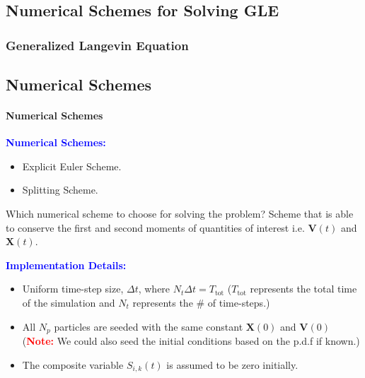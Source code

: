 \documentclass[a4paper,10pt]{beamer}
\newcommand{\BS}[1]{\boldsymbol{#1}}
\begin{document}
	\begin{frame}
		\section{Numerical Schemes for Solving GLE}
		\frametitle{Generalized Langevin Equation}
		\subsection{Numerical Schemes}
		\framesubtitle{Numerical Schemes}
		\footnotesize
		\textcolor{blue}{\textbf{Numerical Schemes:}}
		\begin{itemize}
			\item {Explicit Euler Scheme.}
			\item {Splitting Scheme.}
		\end{itemize}
		\begin{alertblock}{Which numerical scheme to choose for solving the problem?}
			{Scheme that is able to conserve the first and second moments of quantities of interest i.e. $\BS{V}(t)$ and $\BS{X}(t)$.}
		\end{alertblock}
		\textcolor{blue}{\textbf{Implementation Details:}}
		\begin{itemize}
			\item {Uniform time-step size, $\Delta t$, where $N_{t} \Delta t = T_{\text{tot}}$ ($T_{\text{tot}}$ represents the total time of the simulation and $N_{t}$ represents the \# of time-steps.)}
			\item {All $N_{p}$ particles are seeded with the same constant $\BS{X}(0)$ and $\BS{V}(0)$ (\textcolor{red}{\textbf{Note:}} We could also seed the initial conditions based on the p.d.f if known.)}
			\item {The composite variable $S_{i,k}(t)$ is assumed to be zero initially.}
		\end{itemize}
	\end{frame}

	
\end{document}
